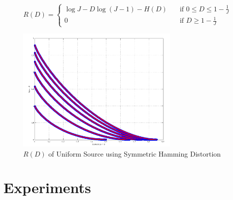 \documentclass[journal]{IEEEtran}
\begin{document}
\begin{equation}
\label{eq:symmetric}
R(D) = 
  \begin{cases}
    \log J - D\log(J-1) - H(D) & \quad \text{if } 0 \leq D \leq 1 - \frac{1}{J}\\
    0 & \quad \text{if } D \geq 1 - \frac{1}{J}
  \end{cases}
\end{equation}

\begin{figure}[!h]
\centering
\includegraphics[width=3.1in]{../images/symmetric.png}
\caption{\(R(D)\) of Uniform Source using Symmetric Hamming Distortion}
\label{fig:symmetric}
\end{figure}

\section{Experiments}
\end{document}
